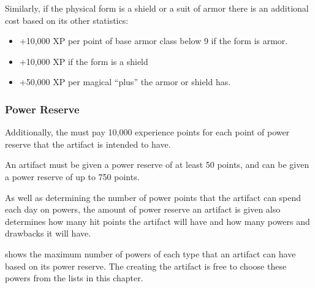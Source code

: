 \begin{multicols*}{2}
Similarly, if the physical form is a shield or a suit of armor there is an additional cost based on its other statistics:

\begin{itemize}
 \item{+10,000 XP per point of base armor class below 9 if the form is armor.}
 \item{+10,000 XP if the form is a shield}
 \item{+50,000 XP per magical “plus” the armor or shield has.}
\end{itemize}


\subsubsection{Power Reserve}
Additionally, the  must pay 10,000 experience points for each point of power reserve that the artifact is intended to have.

An artifact must be given a power reserve of at least 50 points, and can be given a power reserve of up to 750 points.

As well as determining the number of power points that the artifact can spend each day on powers, the amount of power reserve an artifact is given also determines how many hit points the artifact will have and how many powers and drawbacks it will have.

 shows the maximum number of powers of each type that an artifact can have based on its power reserve. The  creating the artifact is free to choose these powers from the lists in this chapter.


\end{multicols*}
